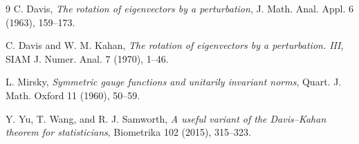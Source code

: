 \documentclass[11pt]{article}
\theoremstyle{remark}
\begin{document}
\begin{thebibliography}{9}
C. Davis,
\emph{The rotation of eigenvectors by a perturbation},
J. Math. Anal. Appl. 6 (1963), 159--173.

C. Davis and W. M. Kahan,
\emph{The rotation of eigenvectors by a perturbation. III},
SIAM J. Numer. Anal. 7 (1970), 1--46.

L. Mirsky,
\emph{Symmetric gauge functions and unitarily invariant norms},
Quart. J. Math. Oxford 11 (1960), 50--59.

Y. Yu, T. Wang, and R. J. Samworth,
\emph{A useful variant of the Davis--Kahan theorem for statisticians},
Biometrika 102 (2015), 315--323.
\end{thebibliography}
\end{document}
